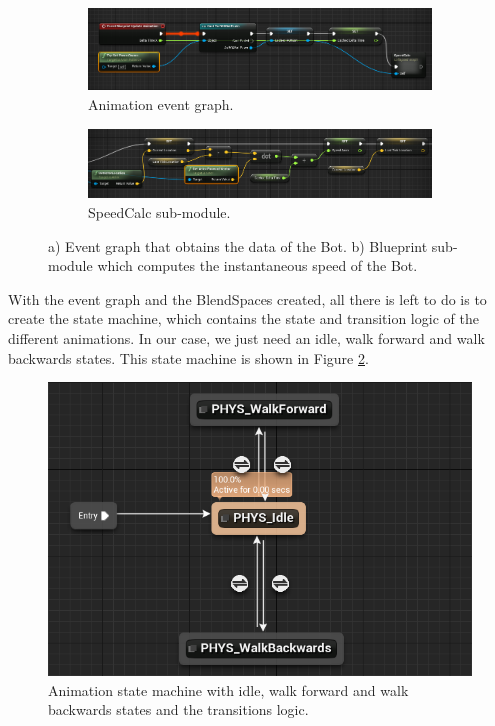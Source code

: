 \begin{figure}[!ht]
	\centering
	\begin{subfigure}[b]{0.8\textwidth}
		\includegraphics[width=1\linewidth]{archivos/animation_event_graph.png}
		\caption{Animation event graph.}
	\end{subfigure}
	
	\begin{subfigure}[b]{0.8\textwidth}
		\includegraphics[width=1\linewidth]{archivos/speed_calc.png}
		\caption{SpeedCalc sub-module.}
	\end{subfigure}
	
	\caption{a) Event graph that obtains the data of the Bot. b) Blueprint sub-module which computes the instantaneous speed of the Bot.}
	\label{fig:event_graph}
\end{figure}

With the event graph and the BlendSpaces created, all there is left to do is to create the state machine, which contains the state and transition logic of the different animations. In our case, we just need an idle, walk forward and walk backwards states. This state machine is shown in Figure \ref{fig:state_machine}.

\begin{figure}[!ht]
	\includegraphics[scale=0.6]{archivos/animation_state_machine.png}
	\centering
	\caption{Animation state machine with idle, walk forward and walk backwards states and the transitions logic.}
	\label{fig:state_machine}
\end{figure}


